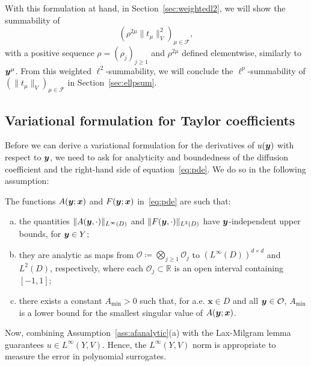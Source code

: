 With this formulation at hand, in Section~\ref{sec:weightedl2}, we will show the summability of
\begin{equation}
(\rho^{2\mu}\|t_\mu\|_{V}^2)_{\mu\in \mathcal{F}}, \label{eq:weightedtaylorseq}
\end{equation}
with a positive sequence $\rho=(\rho_j)_{j \geq 1}$ and $\rho^{2\mu}$ defined elementwise, similarly to ${\bm{y}}^\mu$.
From this weighted $\ell^2$-summability, we will conclude the $\ell^p$-summability of $(\|t_\mu\|_{V})_{\mu\in \mathcal{F}}$ in Section~\ref{sec:ellpsum}.


\subsection{Variational formulation for Taylor coefficients}
\label{sec:taylor}
Before we can derive a variational formulation for the derivatives of ${u}({\bm{y}})$ with respect to ${\bm{y}}$, we need to ask for analyticity and boundedness of the diffusion coefficient and the right-hand side of equation~\eqref{eq:pde}.
We do so in the following assumption:
\begin{assumption} \label{ass:afanalytic}
The functions $A({\bm{y}};\bm{x})$ and $F({\bm{y}};\bm{x})$ in~\eqref{eq:pde} are such that:
\begin{enumerate}[(a)]
	\item the quantities $\|A({\bm{y}}, \cdot)\|_{L^\infty(D)}$ and $\|F({\bm{y}}, \cdot)\|_{L^2(D)}$ have ${\bm{y}}$-in\-de\-pen\-dent upper bounds, for ${\bm{y}} \in Y$;
	\item they are analytic as maps from $\mathcal{O}\coloneqq\bigotimes_{j\geq 1}\mathcal{O}_j$ to $\left(L^\infty(D)\right)^{d\times d}$ and $L^2(D)$, respectively, where each $\mathcal{O}_j\subset\mathbb{R}$ is an open interval containing $[-1,1]$;
	\item there exists a constant $A_{\min}>0$ such that, for a.e. $\bm{x} \in D$ and all ${\bm{y}}\in \mathcal{O}$, $A_{\min}$ is a lower bound for the smallest singular value of $A({\bm{y}}; {{\bm{x}}})$.
\end{enumerate}
\end{assumption}
Now, combining Assumption~\ref{ass:afanalytic}(a) with the Lax-Milgram lemma guarantees $u \in L^\infty(Y, V)$.
Hence, the $L^\infty(Y, V)$ norm is appropriate to measure the error in polynomial surrogates.

